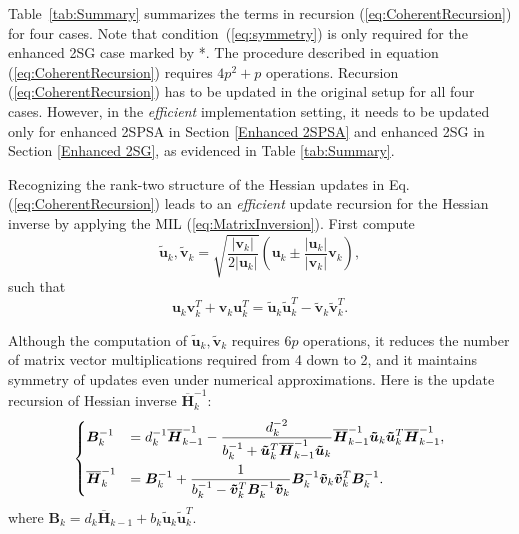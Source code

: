 \documentclass[conference,10.6cpt]{IEEEtran}
\newcommand{\oH}{\bm{\overline{H}}}
\begin{document}
Table~\ref{tab:Summary} summarizes the terms in recursion
(\ref{eq:CoherentRecursion}) for four cases. Note that
condition~(\ref{eq:symmetry}) is only required for the
enhanced 2SG case marked by *. The procedure described in equation
(\ref{eq:CoherentRecursion}) requires $4p^2 + p$ operations. Recursion
(\ref{eq:CoherentRecursion}) has to be updated in the original setup
for all four cases. However, in the \textit{efficient} implementation
setting, it needs to be updated only for enhanced 2SPSA in
Section \ref{Enhanced 2SPSA} and enhanced 2SG in Section
\ref{Enhanced 2SG}, as evidenced in Table \ref{tab:Summary}.

Recognizing the rank-two structure of the Hessian updates in Eq. (\ref{eq:CoherentRecursion}) leads to
an \textit{efficient} update recursion for the Hessian inverse by applying the MIL (\ref{eq:MatrixInversion}). First compute
\begin{equation} \label{eq:Transform}
 \bm{\tilde{u}}_k, \bm{\tilde{v}}_k =
  \sqrt{\frac{|\bm{v}_k|}{2|\bm{u}_k|}} (\bm{u}_k \pm
  \frac{|\bm{u}_k|}{|\bm{v}_k|}\bm{v}_k),
\end{equation}
such that
\begin{equation*} \bm{u}_k \bm{v}_k^{T}+\bm{v}_k \bm{u}_k^{T}
  = \bm{\tilde{u}}_k \bm{\tilde{u}}_k^{T} - \bm{\tilde{v}}_k
  \bm{\tilde{v}}_k^{T}.
\end{equation*}

Although the computation of $\bm{\tilde{u}}_k,
\bm{\tilde{v}}_k$ requires $6p$ operations, it reduces the number of
matrix vector multiplications required from 4 down to 2, and it
maintains symmetry of updates even under numerical approximations. Here is the update recursion of Hessian inverse $\oH_k^{-1}$:
\begin{equation} \label{eq:SequentialUpdate}
  \begin{dcases} \bm{B}_k^{-1} &= d_k^{-1}\oH_{k-1}^{-1}
    -
    \frac{d_k^{-2}}{b_k^{-1}+\bm{\tilde{u}}_k^{T}\oH_{k-1}^{-1}\bm{\tilde{u}}_k}
    \oH_{k-1}^{-1}\bm{\tilde{u}}_k \bm{\tilde{u}}_k^{T}\oH_{k-1}^{-1},\\
    \oH_k^{-1} &=\bm{B}_k^{-1} +
    \frac{1}{b_k^{-1}-\bm{\tilde{v}}_k^{T}\bm{B}_k^{-1}\bm{\tilde{v}}_k}
    \bm{B}_k^{-1}\bm{\tilde{v}}_k \bm{\tilde{v}}_k^{T}\bm{B}_{k}^{-1}.
  \end{dcases}
\end{equation}
where $\bm{B}_k=d_k\oH_{k-1}+b_k\bm{\tilde{u}}_k  \bm{\tilde{u}}_k^{T}$.
\end{document}
